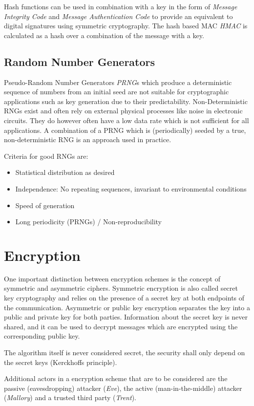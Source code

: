 Hash functions can be used in combination with a key in the form of
\emph{Message Integrity Code} and \emph{Message Authentication Code} to provide
an equivalent to digital signatures using symmetric cryptography. The hash based
MAC \emph{HMAC} is calculated as a hash over a combination of the message with a
key.

\subsection{Random Number Generators}
Pseudo-Random Number Generators \emph{PRNG}s which produce a deterministic
sequence of numbers from an initial seed are not suitable for cryptographic
applications such as key generation due to their predictability.
Non-Deterministic RNGs exist and often rely on external physical processes like
noise in electronic circuits. They do however often have a low data rate which
is not sufficient for all applications. A combination of a PRNG which is
(periodically) seeded by a true, non-deterministic RNG is an approach used in
practice.

Criteria for good RNGs are:
\begin{itemize}
    \item Statistical distribution as desired
    \item Independence: No repeating sequences, invariant to environmental
          conditions
    \item Speed of generation
    \item Long periodicity (PRNGs) / Non-reproducibility
\end{itemize}


\section{Encryption}
One important distinction between encryption schemes is the concept of symmetric
and asymmetric ciphers. Symmetric encryption is also called secret key
cryptography and relies on the presence of a secret key at both endpoints of the
communication. Asymmetric or public key encryption separates the key into a
public and private key for both parties. Information about the secret key is
never shared, and it can be used to decrypt messages which are encrypted using
the corresponding public key.

The algorithm itself is never considered secret, the security shall only depend
on the secret keys (Kerckhoffs principle).

Additional actors in a encryption scheme that are to be considered are the
passive (eavesdropping) attacker (\textit{Eve}), the active (man-in-the-middle)
attacker (\textit{Mallory}) and a trusted third party (\textit{Trent}).

